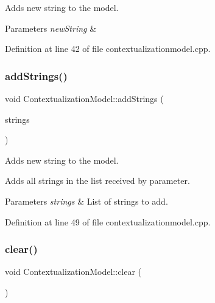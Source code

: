 Adds new string to the model. 


\begin{DoxyParams}{Parameters}
{\em new\+String} & \\
\hline
\end{DoxyParams}


Definition at line 42 of file contextualizationmodel.\+cpp.

\mbox{\label{classContextualizationModel_a24021cc16a5215c9765602b311fe9f77}} 
\subsubsection{\texorpdfstring{add\+Strings()}{addStrings()}}
{\footnotesize\ttfamily void Contextualization\+Model\+::add\+Strings (\begin{DoxyParamCaption}\item[{Q\+List$<$ \mbox{\hyperlink{classFirmwareString}{Firmware\+String}} $\ast$$>$ \&}]{strings }\end{DoxyParamCaption})}



Adds new string to the model. 

Adds all strings in the list received by parameter. 
\begin{DoxyParams}{Parameters}
{\em strings} & List of strings to add. \\
\hline
\end{DoxyParams}


Definition at line 49 of file contextualizationmodel.\+cpp.

\mbox{\label{classContextualizationModel_a17eeedb3696fd1d759761c0184d3dedc}} 
\subsubsection{\texorpdfstring{clear()}{clear()}}
{\footnotesize\ttfamily void Contextualization\+Model\+::clear (\begin{DoxyParamCaption}{ }\end{DoxyParamCaption})}



